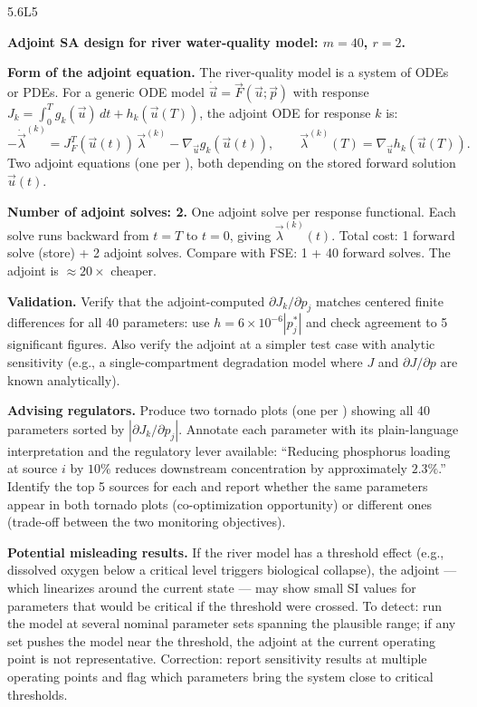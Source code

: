 \begin{solution}{5.6}{L5}

\solanswer

\textbf{Adjoint SA design for river water-quality model: $m = 40$, $r = 2$.}

 \textbf{Form of the adjoint equation.}
The river-quality model is a system of ODEs or PDEs. For a generic
ODE model $\dot{\vec{u}} = \vec{F}(\vec{u};\vec{p})$ with response
$J_k = \int_0^T g_k(\vec{u})\,dt + h_k(\vec{u}(T))$, the adjoint ODE for
response $k$ is:
\[
  -\dot{\vec{\lambda}}^{(k)} = J_F^T(\vec{u}(t))\,\vec{\lambda}^{(k)}
  - \nabla_{\vec{u}} g_k(\vec{u}(t)), \qquad
  \vec{\lambda}^{(k)}(T) = \nabla_{\vec{u}} h_k(\vec{u}(T)).
\]
Two adjoint equations (one per \QOI), both depending on the stored
forward solution $\vec{u}(t)$.

 \textbf{Number of adjoint solves: 2.}
One adjoint solve per response functional. Each solve runs backward
from $t = T$ to $t = 0$, giving $\vec{\lambda}^{(k)}(t)$.
Total cost: 1 forward solve (store) + 2 adjoint solves.
Compare with FSE: 1 + 40 forward solves.
The adjoint is $\approx 20\times$ cheaper.

 \textbf{Validation.}
Verify that the adjoint-computed $\partial J_k/\partial p_j$ matches
centered finite differences for all 40 parameters: use $h = 6\times10^{-6}|p_j^*|$
and check agreement to 5 significant figures. Also verify the adjoint
at a simpler test case with analytic sensitivity (e.g., a single-compartment
degradation model where $J$ and $\partial J/\partial p$ are known analytically).

 \textbf{Advising regulators.}
Produce two tornado plots (one per \QOI) showing all 40 parameters
sorted by $|\partial J_k/\partial p_j|$. Annotate each parameter with its
plain-language interpretation and the regulatory lever available:
``Reducing phosphorus loading at source $i$ by $10\%$ reduces downstream
concentration by approximately $2.3\%$.'' Identify the top 5 sources
for each \QOI and report whether the same parameters appear in both
tornado plots (co-optimization opportunity) or different ones
(trade-off between the two monitoring objectives).

 \textbf{Potential misleading results.}
If the river model has a threshold effect (e.g., dissolved oxygen below
a critical level triggers biological collapse), the adjoint — which
linearizes around the current state — may show small SI values for
parameters that would be critical if the threshold were crossed.
To detect: run the model at several nominal parameter sets spanning the
plausible range; if any set pushes the model near the threshold,
the adjoint at the current operating point is not representative.
Correction: report sensitivity results at multiple operating points
and flag which parameters bring the system close to critical thresholds.


\end{solution}
